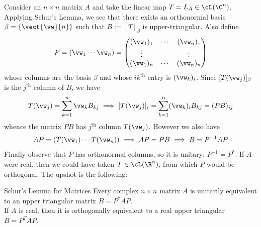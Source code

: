 Consider an $n\times n$ matrix $A$ and take the linear map $T=L_A\in\cL(\C^n)$. Applying Schur's Lemma, we see that there exists an orthonormal basis $\beta=\{\vect{\vw}{n}\}$ such that $B:=[T]_\beta$ is upper-triangular. Also define
\[P=(\vw_1\cdots\vw_n)=\begin{pmatrix}
(\vw_1)_1&\cdots&(\vw_n)_1\\
\vdots&&\vdots\\
(\vw_1)_n&\cdots&(\vw_n)_n
\end{pmatrix}\]
whose columns are the basis $\beta$ and whose $ik^\text{th}$ entry is $(\vw_k)_i$. Since $[T(\vw_j)]_\beta$ is the $j^\text{th}$ column of $B$, we have
\[T(\vw_j)=\sum_{k=1}^n \vw_kB_{kj} \implies [T(\vw_j)]_i=\sum_{k=1}^n (\vw_k)_iB_{kj} =(PB)_{ij}\]
whence the matrix $PB$ has $j^\text{th}$ column $T(\vw_j)$. However we also have
\[AP=(T(\vw_1)\cdots T(\vw_n))\implies AP=PB\implies B=P^{-1}AP\]
Finally observe that $P$ has orthonormal columns, so it is unitary: $P^{-1}=P^*$. If $A$ were real, then we could have taken $T\in\cL(\R^n)$, from which $P$ would be orthogonal. The upshot is the following:

\begin{cor}{Schur's Lemma for Matrices}{}
Every complex $n\times n$ matrix $A$ is unitarily equivalent to an upper triangular matrix $B=P^*AP$.\\
If $A$ is real, then it is orthogonally equivalent to a real upper triangular $B=P^TAP$.
\end{cor}


